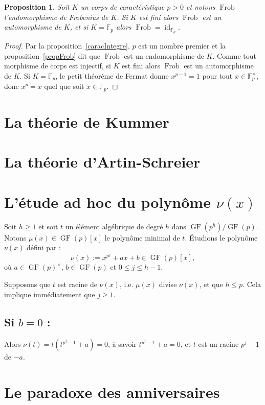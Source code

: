 \documentclass[a4paper, titlepage]{article}
\newtheorem{prop}[theo]{Proposition}
\theoremstyle{definition}
\theoremstyle{remark}
\def\F{\mathbb F}
\def\gf{\operatorname{GF}}
\def\frob{\operatorname{Frob}}
\def\id{\operatorname{id}}
\begin{document}
\begin{prop}
Soit $K$ un corps de caractéristique $p > 0$ et notons $\frob$ l'endomorphisme de Frobenius de $K$. Si $K$ est fini alors $\frob$ est un automorphisme de $K$, et si $K = \F_p$ alors $\frob = \id_{\F_p}$.
\end{prop}

\begin{proof}
Par la proposition~\ref{caracIntegre}, $p$ est un nombre premier et la proposition~\ref{propFrob} dit que $\frob$ est un endomorphisme de $K$. Comme tout morphisme de corps est injectif, si $K$ est fini alors $\frob$ est un automorphisme de $K$. Si $K = \F_p$, le petit théorème de Fermat donne $x^{p-1} = 1$ pour tout $x \in \F_p^\times$, donc $x^p =x$ quel que soit $x \in\F_p$.
\end{proof}

\section{La théorie de Kummer}

\section{La théorie d'Artin-Schreier}

\section{L'étude ad hoc du polynôme $\nu(x)$}

Soit $h \geqslant 1$ et soit $t$ un élément algébrique de degré $h$ dans $\gf(p^h)/\gf(p)$. Notons $\mu(x) \in \gf(p)[x]$ le polynôme minimal de $t$.
Étudions le polynôme $\nu(x)$ défini par :
$$\nu(x) := x^{p^j} +ax +b \in \gf(p)[x],$$
où $a\in \gf(p)^\times$, $b\in \gf(p)$ et $0\leqslant j \leqslant h-1$.

Supposons que $t$ est racine de $\nu(x)$, i.e. $\mu(x)$ divise $\nu(x)$, et que $h \leqslant p$. Cela implique immédiatement que $j \geqslant 1$.

\subsection*{Si $b = 0$ :}
Alors $\nu(t) = t\left( t^{p^{j}-1} + a\right) =0$, à savoir $t^{p^{j}-1} + a = 0$, et $t$ est un racine ${p^{j}-1}$ de $-a$.

\section{Le paradoxe des anniversaires}
\end{document}

